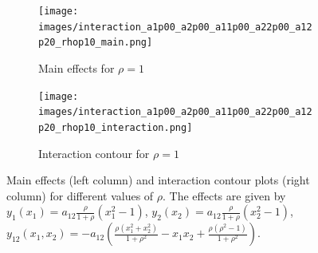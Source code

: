 \begin{figure}[htpb]
    \vspace{0.5em}
    \begin{subfigure}[t]{0.49\textwidth}
        \centering
        \texttt{[image: images/interaction\_a1p00\_a2p00\_a11p00\_a22p00\_a12p20\_rhop10\_main.png]}
        \caption{Main effects for $\rho = 1$}
    \end{subfigure}%
    \hfill
    \begin{subfigure}[t]{0.49\textwidth}
        \centering
        \texttt{[image: images/interaction\_a1p00\_a2p00\_a11p00\_a22p00\_a12p20\_rhop10\_interaction.png]}
        \caption{Interaction contour for $\rho = 1$}
    \end{subfigure}

    \caption{Main effects (left column) and interaction contour plots (right column) for different values of $\rho$. The effects are given by $y_{1}(x_1) = a_{12} \frac{\rho}{1+ \rho} (x_1^2 - 1)$,
    $y_{2}(x_2) = a_{12} \frac{\rho}{1+ \rho} (x_2^2 - 1)$,
    $y_{12}(x_1,x_2) = -a_{12}\!\left(\frac{\rho(x_1^2+x_2^2)}{1+\rho^2} - x_1 x_2 + \frac{\rho(\rho^2-1)}{1+\rho^2}\right)$.}
    \label{fig:interaction_combined}
\end{figure}



